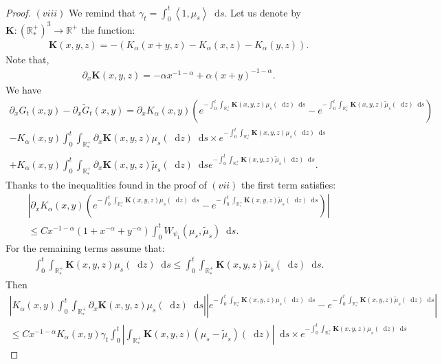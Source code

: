 \documentclass[11pt,a4paper]{article}
\newcommand{\RR}{\mathbb{R}}
\newcommand{\RRP}{\mathbb{R}^+_*}
\newcommand{\brac}[1]{\left\langle#1\right\rangle}
\newcommand{\dd}{\mathop{}\!\mathrm{d}}
\begin{document}
\begin{proof}
    $(viii)$ We remind that $\gamma_t = \int_0^t \brac{1,\mu_s} \dd s$. Let us denote by $\mathbf{K} : \left(\RRP\right)^3 \to \RR^+$ the function:
    \begin{align*}
        \mathbf{K}(x,y,z) = -\left(K_\alpha(x+y,z) - K_\alpha(x,z) -K_\alpha(y,z)\right).
    \end{align*}
    Note that,
    \begin{align*}
        \partial_x \mathbf{K}(x,y,z) = -\alpha x^{-1-\alpha}  + \alpha (x + y)^{-1-\alpha}.
    \end{align*}
    We have 
    \begin{multline*}
        \partial_x G_t(x,y)- \partial_x \tilde{G}_t(x,y) = \partial_x K_\alpha(x,y) \left( e^{-\int_0^t \int_{\RRP}\mathbf{K}(x,y,z)\mu_s(\dd z) \dd s} 
        -  e^{-\int_0^t \int_{\RRP}\mathbf{K}(x,y,z)\tilde{\mu}_s(\dd z) \dd s} \right) \\
        - K_\alpha(x,y) \int_0^t \int_{\RRP} \partial_x \mathbf{K}(x,y,z)\mu_s(\dd z) \dd s \times e^{-\int_0^t \int_{\RRP}\mathbf{K}(x,y,z)\mu_s(\dd z) \dd s} \\
        + K_\alpha(x,y)\int_0^t \int_{\RRP}\partial_x \mathbf{K}(x,y,z)\tilde{\mu}_s(\dd z) \dd s e^{-\int_0^t \int_{\RRP}\mathbf{K}(x,y,z)\tilde{\mu}_s(\dd z) \dd s}.
    \end{multline*}
    Thanks to the inequalities found in the proof of $(vii)$ the first term satisfies:
    \begin{multline*}
        \left| \partial_x K_\alpha(x,y) \left( e^{-\int_0^t \int_{\RRP}\mathbf{K}(x,y,z)\mu_s(\dd z) \dd s} 
        -  e^{-\int_0^t \int_{\RRP}\mathbf{K}(x,y,z)\tilde{\mu}_s(\dd z) \dd s} \right)\right| \\
         \leq C x^{-1-\alpha} (1 + x^{-\alpha} + y^{-\alpha}) \int_0^t W_{\psi_1}(\mu_s,\tilde{\mu}_s) \dd s.
    \end{multline*}
    For the remaining terms assume that:
    \begin{align*}
        \int_0^t \int_{\RRP}\mathbf{K}(x,y,z)\mu_s(\dd z) \dd s \leq \int_0^t \int_{\RRP}\mathbf{K}(x,y,z)\tilde{\mu}_s(\dd z) \dd s.
    \end{align*}
    Then
    \begin{multline*}
        \left| K_\alpha(x,y) \int_0^t \int_{\RRP} \partial_x \mathbf{K}(x,y,z)\mu_s(\dd z) \dd s \right|
        \left|e^{-\int_0^t \int_{\RRP}\mathbf{K}(x,y,z)\mu_s(\dd z) \dd s} - e^{-\int_0^t \int_{\RRP}\mathbf{K}(x,y,z)\tilde{\mu}_s(\dd z) \dd s}\right| \\
        \leq C x^{-1-\alpha} K_\alpha(x,y) \gamma_t  \int_0^t \left| \int_{\RRP}\mathbf{K}(x,y,z)(\mu_s-\tilde{\mu}_s)(\dd z) \right| \dd s \times e^{-\int_0^t \int_{\RRP}\mathbf{K}(x,y,z)\mu_s(\dd z) \dd s}

\end{multline*}
\end{proof}
\end{document}
